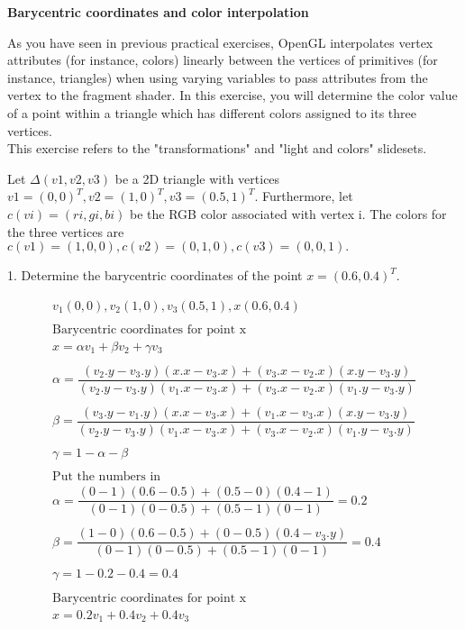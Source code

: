 \documentclass[10pt,a4paper]{article}
\begin{document}
\begin{flushleft}
{\bf Barycentric coordinates and color interpolation } \\
\end{flushleft}

As you have seen in previous practical exercises, OpenGL interpolates vertex attributes (for instance, colors) linearly between the vertices of primitives (for instance, triangles) when using varying variables to pass attributes from the vertex to the fragment shader. In this exercise, you will determine the color value of a point within a triangle which has different colors assigned to its three vertices. \\

This exercise refers to the "transformations" and "light and colors" slidesets.

Let $\Delta(v1,v2,v3)$ be a 2D triangle with vertices $v1=(0,0)^T, v2=(1,0)^T, v3=(0.5,1)^T$. Furthermore, let $c(vi)=(ri,gi,bi)$ be the RGB color associated with vertex i. The colors for the three vertices are $c(v1)=(1,0,0), c(v2)=(0,1,0), c(v3)=(0,0,1).$

\begin{flushleft}
1. Determine the barycentric coordinates of the point $x=(0.6,0.4)^T$.
\end{flushleft}

\begin{gather*}
v_1(0,0), v_2(1,0), v_3(0.5,1), x(0.6, 0.4) \\ \\
\text{Barycentric coordinates for point x} \\
x = \alpha v_1 +  \beta v_2 + \gamma v_3 \\ \\
\alpha = \dfrac{(v_2.y - v_3.y)(x.x - v_3.x) + (v_3.x - v_2.x)(x.y - v_3.y)}{(v_2.y - v_3.y)(v_1.x - v_3.x) + (v_3.x - v_2.x)(v_1.y - v_3.y)} \\ \\
\beta = \dfrac{(v_3.y - v_1.y)(x.x - v_3.x) + (v_1.x - v_3.x)(x.y - v_3.y)}{(v_2.y - v_3.y)(v_1.x - v_3.x) + (v_3.x - v_2.x)(v_1.y - v_3.y)} \\ \\
\gamma = 1 - \alpha - \beta \\ \\
\text{Put the numbers in} \\
\alpha = \dfrac{(0 - 1)(0.6 - 0.5) + (0.5 - 0)(0.4 - 1)}{(0 - 1)(0 - 0.5) + (0.5 - 1)(0 - 1)} = 0.2 \\ \\
\beta = \dfrac{(1 - 0)(0.6 - 0.5) + (0 - 0.5)(0.4 - v_3.y)}{(0 - 1)(0 - 0.5) + (0.5 - 1)(0 - 1)} = 0.4 \\ \\
\gamma = 1 - 0.2 - 0.4 = 0.4 \\ \\
\text{Barycentric coordinates for point x} \\
x = 0.2 v_1 +  0.4 v_2 + 0.4 v_3
\end{gather*}
\end{document}
